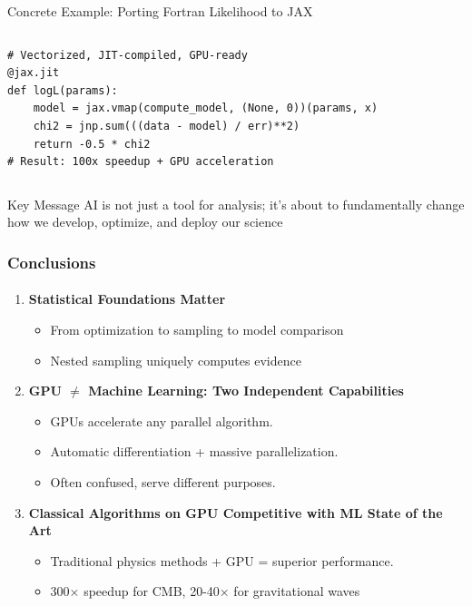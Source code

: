 \documentclass[aspectratio=169]{beamer}
\begin{document}
\begin{frame}[fragile]
\begin{exampleblock}{Concrete Example: Porting Fortran Likelihood to JAX}
\begin{columns}[T]
\begin{verbatim}
# Vectorized, JIT-compiled, GPU-ready
@jax.jit
def logL(params):
    model = jax.vmap(compute_model, (None, 0))(params, x)
    chi2 = jnp.sum(((data - model) / err)**2)
    return -0.5 * chi2
# Result: 100x speedup + GPU acceleration
            \end{verbatim}
        \end{columns}
    \end{exampleblock}
    \begin{alertblock}{Key Message}
        AI is not just a tool for analysis; it's about to fundamentally change how we develop, optimize, and deploy our science
    \end{alertblock}
\end{frame}

\begin{frame}
    \frametitle{Conclusions}
    \framesubtitle{}
        \begin{enumerate}
            \item \textbf{Statistical Foundations Matter}
                \begin{itemize}
                    \item From optimization to sampling to model comparison
                    \item Nested sampling uniquely computes evidence
                \end{itemize}
            \item \textbf{GPU $\neq$ Machine Learning: Two Independent Capabilities}
                \begin{itemize}
                    \item GPUs accelerate any parallel algorithm.
                    \item Automatic differentiation + massive parallelization.
                    \item Often confused, serve different purposes.
                \end{itemize}
            \item \textbf{Classical Algorithms on GPU Competitive with ML State of the Art}
                \begin{itemize}
                    \item Traditional physics methods + GPU = superior performance.
                    \item 300× speedup for CMB, 20-40× for gravitational waves
                \end{itemize}

\end{enumerate}
\end{frame}
\end{document}
